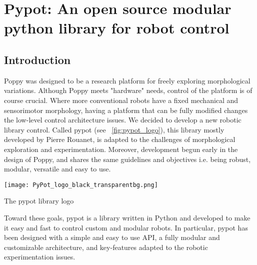 
\cleartoleftpage

\chapter{Pypot: An open source modular python library for robot control} %

\section{Introduction} %

Poppy was designed to be a research platform for freely exploring morphological variations. Although Poppy meets "hardware" needs, control of the platform is of course crucial. Where more conventional robots have a fixed mechanical and sensorimotor morphology, having a platform that can be fully modified changes the low-level control architecture issues.
We decided to develop a new robotic library control. Called pypot (see \figurename~\ref{fig:pypot_logo}), this library mostly developed by Pierre Rouanet, is adapted to the challenges of morphological exploration and experimentation. Moreover, development begun early in the design of Poppy, and shares the same guidelines and objectives i.e. being robust, modular, versatile and easy to use.

\begin{Row}%
\begin{Cell}{2}

\begin{NFfigure}
    \begin{center}
        \texttt{[image: PyPot\_logo\_black\_transparentbg.png]}
    \end{center}
    \caption{The pypot library logo}
    \label{fig:pypot_logo}
\end{NFfigure}

\end{Cell}
\begin{Cell}{4}
Toward these goals, pypot is a library written in Python and developed to make it easy and fast to control custom and modular robots. In particular, pypot has been designed with a simple and easy to use API, a fully modular and customizable architecture, and key-features adapted to the robotic experimentation issues.
\end{Cell}
\end{Row}





